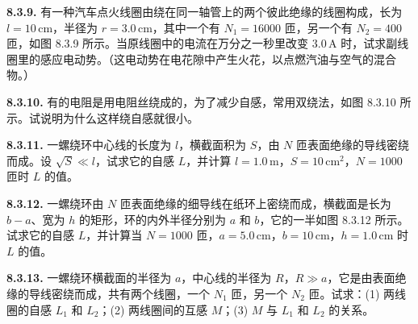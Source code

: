 \begin{center}
\end{center}

\vfill
\newpage

\textbf{8.3.9.} 有一种汽车点火线圈由绕在同一轴管上的两个彼此绝缘的线圈构成，长为 $l = 10\,\mathrm{cm}$，半径为 $r = 3.0\,\mathrm{cm}$，其中一个有 $N_{1} = 16000$ 匝，另一个有 $N_{2} = 400$ 匝，如图 8.3.9 所示。当原线圈中的电流在万分之一秒里改变 $3.0\,\mathrm{A}$ 时，试求副线圈里的感应电动势。（这电动势在电花隙中产生火花，以点燃汽油与空气的混合物。）

\begin{center}
\end{center}

\vfill
\newpage

\textbf{8.3.10.} 有的电阻是用电阻丝绕成的，为了减少自感，常用双绕法，如图 8.3.10 所示。试说明为什么这样绕自感就很小。

\begin{center}
\end{center}

\vfill
\newpage

\textbf{8.3.11.} 一螺绕环中心线的长度为 $l$，横截面积为 $S$，由 $N$ 匝表面绝缘的导线密绕而成。设 $\sqrt{S} \ll l$，试求它的自感 $L$，并计算 $l = 1.0\,\mathrm{m}$，$S = 10\,\mathrm{cm}^2$，$N = 1000$ 匝时 $L$ 的值。

\vfill
\newpage

\textbf{8.3.12.} 一螺绕环由 $N$ 匝表面绝缘的细导线在纸环上密绕而成，横截面是长为 $b - a$、宽为 $h$ 的矩形，环的内外半径分别为 $a$ 和 $b$，它的一半如图 8.3.12 所示。试求它的自感 $L$，并计算当 $N = 1000$ 匝，$a = 5.0\,\mathrm{cm}$，$b = 10\,\mathrm{cm}$，$h = 1.0\,\mathrm{cm}$ 时 $L$ 的值。

\begin{center}
\end{center}

\vfill
\newpage

\textbf{8.3.13.} 一螺绕环横截面的半径为 $a$，中心线的半径为 $R$，$R \gg a$，它是由表面绝缘的导线密绕而成，共有两个线圈，一个 $N_1$ 匝，另一个 $N_2$ 匝。试求：(1) 两线圈的自感 $L_1$ 和 $L_2$；(2) 两线圈间的互感 $M$；(3) $M$ 与 $L_1$ 和 $L_2$ 的关系。

\vfill
\newpage

